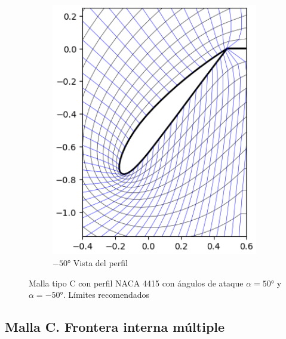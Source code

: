 \documentclass[letterpaper, openright, 12pt]{book}
\begin{document}
\begin{figure}[htbp!]
\begin{subfigure}[c]{0.45\textwidth}
            \includegraphics[keepaspectratio,
                width=0.99\textwidth]{./img/naca4415_c_-50}
            \caption{$-50\si{\degree}$ Vista del perfil}
            \label{fig:naca4415_c_-50}
        \end{subfigure}
        \caption[Malla tipo C. Vista de los límites recomendados]{Malla tipo C
            con perfil NACA 4415 con ángulos de ataque
            $\alpha = 50\si{\degree}$ y $\alpha = -50\si{\degree}$. Límites
            recomendados}
    \end{figure}

    \subsection{Malla C. Frontera interna múltiple}
\end{document}
